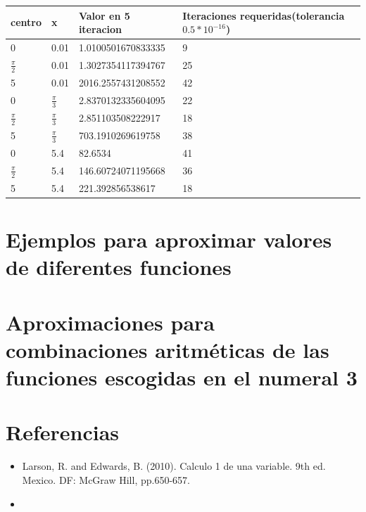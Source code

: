 \documentclass[12pt]{article}
\begin{document}
        \begin{center}
            \begin{tabular}{|l|l|l|l|} \hline
            centro & x & Valor en 5 iteracion & Iteraciones requeridas(tolerancia $0.5*10^{-16}$)\\
            \hline \hline
            0 & 0.01 &  1.0100501670833335 & 9 \\
            \hline 
            $\frac{\pi}{2}$ & 0.01 & 1.3027354117394767 & 25 \\
            \hline
            5 & 0.01 & 2016.2557431208552 & 42 \\
            \hline
            0 &$\frac{\pi}{3}$ &  2.8370132335604095 & 22 \\
            \hline 
            $\frac{\pi}{2}$ & $\frac{\pi}{3}$ & 2.851103508222917 & 18 \\
            \hline
            5 & $\frac{\pi}{3}$ & 703.1910269619758 & 38 \\
            \hline
            0 & 5.4 &  82.6534  & 41 \\
            \hline 
            $\frac{\pi}{2}$ & 5.4 & 146.60724071195668 & 36 \\
            \hline
            5 & 5.4 & 221.392856538617 & 18 \\
            \hline
            \end{tabular}
        \end{center}
        \section {Ejemplos para aproximar valores de diferentes funciones}

        \section {Aproximaciones para combinaciones aritméticas de las funciones escogidas en el numeral 3}

        \section {Referencias}

        \begin{itemize}
        \item{Larson, R. and Edwards, B. (2010). Calculo 1 de una variable. 9th ed. Mexico. DF: McGraw Hill, pp.650-657.}
        \item{}
        \end{itemize}
\end{document}
